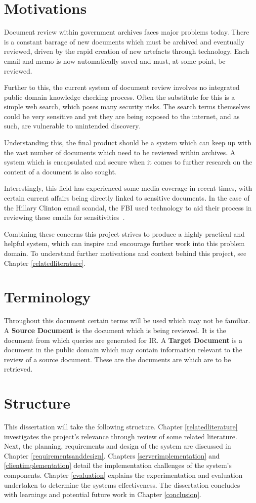 \documentclass{l4proj}
\begin{document}
\section{Motivations}
Document review within government archives faces major problems today. There is a constant barrage of new documents which must be archived and eventually reviewed, driven by the rapid creation of new artefacts through technology. Each email and memo is now automatically saved and must, at some point, be reviewed.

Further to this, the current system of document review involves no integrated public domain knowledge checking process. Often the substitute for this is a simple web search, which poses many security risks. The search terms themselves could be very sensitive and yet they are being exposed to the internet, and as such, are vulnerable to unintended discovery.

Understanding this, the final product should be a system which can keep up with the vast number of documents which need to be reviewed within archives. A system which is encapsulated and secure when it comes to further research on the content of a document is also sought.

Interestingly, this field has experienced some media coverage in recent times, with certain current affairs being directly linked to sensitive documents. In the case of the Hillary Clinton email scandal, the FBI used technology to aid their process in reviewing these emails for sensitivities~\cite{cnnclinton}. 

Combining these concerns this project strives to produce a highly practical and helpful system, which can inspire and encourage further work into this problem domain. To understand further motivations and context behind this project, see Chapter \ref{relatedliterature}.

\section{Terminology}
Throughout this document certain terms will be used which may not be familiar.
A \textbf{Source Document} is the document which is being reviewed. It is the document from which queries are generated for IR.
A \textbf{Target Document} is a document in the public domain which may contain information relevant to the review of a source document. These are the documents are which are to be retrieved.

\section{Structure}
This dissertation will take the following structure.
Chapter \ref{relatedliterature} investigates the project's relevance through review of some related literature.
Next, the planning, requirements and design of the system are discussed in Chapter \ref{requirementsanddesign}.
Chapters \ref{serverimplementation} and \ref{clientimplementation} detail the implementation challenges of the system's components.
Chapter \ref{evaluation} explains the experimentation and evaluation undertaken to determine the systems effectiveness. The dissertation concludes with learnings and potential future work in Chapter \ref{conclusion}.
\end{document}
